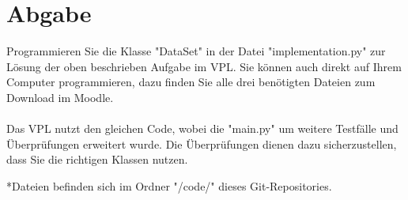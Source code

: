 \documentclass[]{article}
\begin{document}
\section{Abgabe}
Programmieren Sie die Klasse "DataSet" in der Datei "implementation.py" zur Lösung der oben beschrieben Aufgabe im VPL.
Sie können auch direkt auf Ihrem Computer programmieren, dazu finden Sie alle drei benötigten Dateien zum Download im Moodle.\\
\\
Das VPL nutzt den gleichen Code, wobei die "main.py" um weitere Testfälle und Überprüfungen erweitert wurde.
Die Überprüfungen dienen dazu sicherzustellen, dass Sie die richtigen Klassen nutzen.\\

\hline

*Dateien befinden sich im Ordner "/code/" dieses Git-Repositories.
\end{document}
